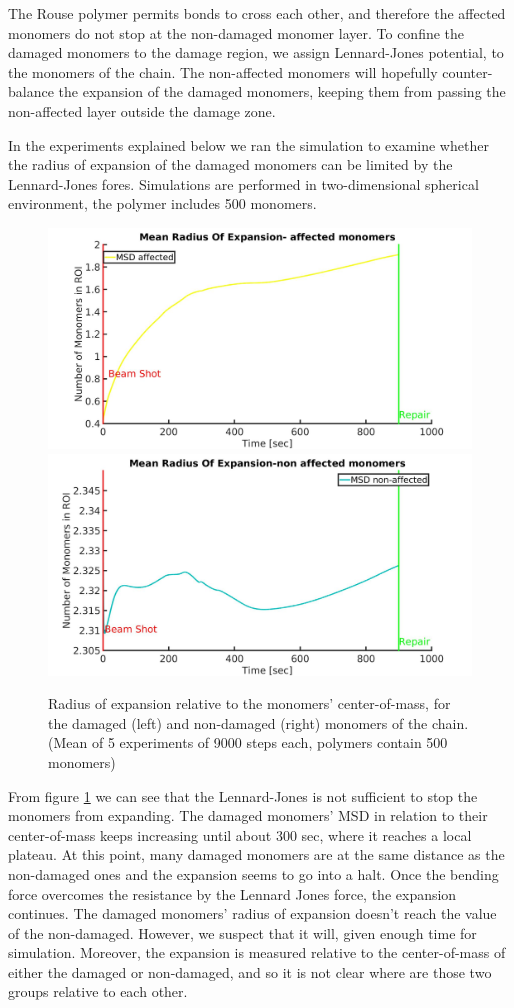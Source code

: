 \documentclass[12pt]{report}
\begin{document}
      The Rouse polymer permits bonds to cross each other, and therefore the affected monomers do not stop at the non-damaged monomer layer. 
      To confine the damaged monomers to the damage region, we assign Lennard-Jones potential, to the monomers of the chain. The non-affected monomers will hopefully counter-balance the expansion of the damaged monomers, keeping them from passing the non-affected layer outside the damage zone.
      
      In the experiments explained below we ran the simulation to examine whether the radius of expansion of the damaged monomers can be limited by the Lennard-Jones fores. Simulations are performed in two-dimensional spherical environment, the polymer includes 500 monomers.      
      
     \begin{figure}[H]
     \includegraphics[width=0.5\linewidth, height=0.3\textheight]{RadiusOfExpansion500BeadsLennardJones}
    	\includegraphics[width=0.5\linewidth, height=0.3\textheight]{RadiusOfExpansion500BeadsNonAffectedLennardJones}
        \caption{Radius of expansion relative to the monomers' center-of-mass, for the damaged (left) and non-damaged (right) monomers of the chain.(Mean of 5 experiments of 9000 steps each, polymers contain 500 monomers)}
        \label{fig:RadiusOfExpansion500BeadsLennardJones}
      \end{figure}
      
      From figure \ref{fig:RadiusOfExpansion500BeadsLennardJones} we can see that the Lennard-Jones is not sufficient to stop the monomers from expanding. The damaged monomers' MSD in relation to their center-of-mass keeps increasing until about 300 sec, where it reaches a local plateau. At this point, many damaged monomers are at the same distance as the non-damaged ones and the expansion seems to go into a halt. Once the bending force overcomes the resistance by the Lennard Jones force, the expansion continues. The damaged monomers' radius of expansion doesn't reach the value of the non-damaged. However, we suspect that it will, given enough time for simulation. Moreover, the expansion is measured relative to the center-of-mass of either the damaged or non-damaged, and so it is not clear where are those two groups relative to each other. 
      
\end{document}
